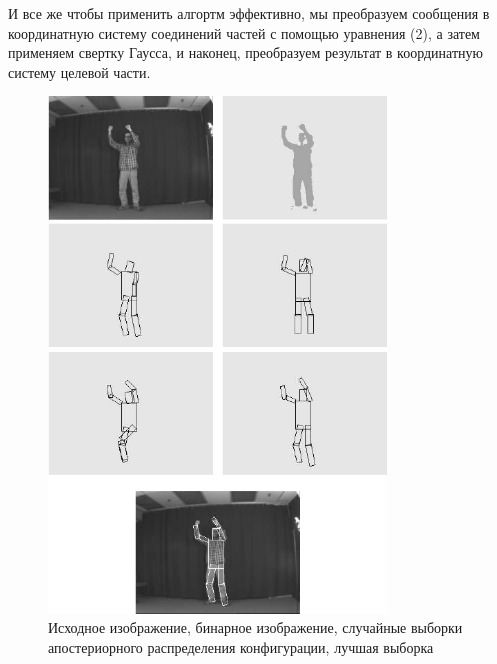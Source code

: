 И все же чтобы применить алгортм эффективно, мы преобразуем сообщения в координатную систему соединений частей с помощью уравнения (2), а затем применяем свертку Гаусса, и наконец, преобразуем результат в координатную систему целевой части.

\begin{figure}
  \centering
  \includegraphics[width=0.8\textwidth]{images/detection-stages.png}
  \caption{Исходное изображение, бинарное изображение, случайные выборки апостериорного распределения конфигурации, лучшая выборка\label{detection-stages}}
\end{figure}


